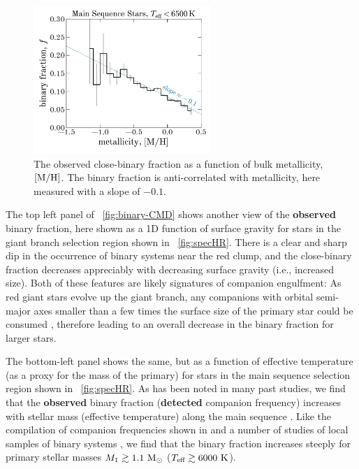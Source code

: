 \documentclass[modern]{aastex63}
\newcommand{\changes}[1]{{\bf\color{purple}#1}}
\begin{document}
\begin{figure}[!t]
    \begin{center}
    \includegraphics[width=0.6\textwidth]{fraction_M_H.pdf}
    \end{center}
    \caption{%
    The observed close-binary fraction as a function of bulk metallicity, $[{\rm
    M}/{\rm H}]$.
    The binary fraction is anti-correlated with metallicity, here measured with
    a slope of $-0.1$.
    \label{fig:binfrac-mh}
    }
\end{figure}

The top left panel of \figurename~\ref{fig:binary-CMD} shows another view of the
\changes{observed} binary fraction, here shown as a 1D function of surface gravity for stars in the
giant branch selection region shown in \figurename~\ref{fig:specHR}.
There is a clear and sharp dip in the occurrence of binary systems near the red
clump, and the close-binary fraction decreases appreciably with decreasing
surface gravity (i.e., increased size).
Both of these features are likely signatures of companion engulfment: As red
giant stars evolve up the giant branch, any companions with orbital semi-major
axes smaller than a few times the surface size of the primary star could be
consumed \citep{Ivanova:2013}, therefore leading to an overall decrease in the
binary fraction for larger stars.

The bottom-left panel shows the same, but as a function of effective temperature
(as a proxy for the mass of the primary) for stars in the main sequence
selection region shown in \figurename~\ref{fig:specHR}.
As has been noted in many past studies, we find that the \changes{observed} binary fraction
(\changes{detected} companion frequency) increases with stellar mass (effective temperature) along
the main sequence \citep[e.g.,][]{Duchene:2013}.
Like the compilation of companion frequencies shown in \cite{Duchene:2013} and a
number of studies of local samples of binary systems
\citep[e.g.,][]{Eggleton:2008, Raghavan:2010, Gao:2014}, we find that the binary
fraction increases steeply for primary stellar masses $M_1 \gtrsim 1.1~\mathrm{M}_\odot$
($T_{\textrm{eff}} \gtrsim 6000~\textrm{K}$).
\end{document}

